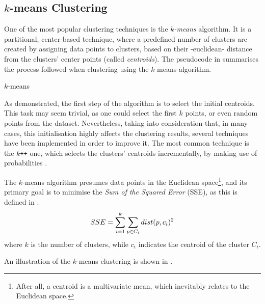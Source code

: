 \subsection{\texorpdfstring{$k$}{k}-means Clustering}
\label{subsec:k-means-clustering}

One of the most popular clustering techniques is the \textit{$k$-means} algorithm. It is a partitional, center-based technique, where a predefined number of clusters are created by assigning data points to clusters, based on their -euclidean- distance from the clusters' center points (called \textit{centroids}). The pseudocode in  summarises the process followed when clustering using the $k$-means algorithm.

\begin{algorithm}[ht]
\caption[$k$-means]{$k$-means}
\label{algorithms:k-means}

\end{algorithm}

As demonstrated, the first step of the algorithm is to select the initial centroids. This task may seem trivial, as one could select the first $k$ points, or even random points from the dataset. Nevertheless, taking into consideration that, in many cases, this initialisation highly affects the clustering results, several techniques have been implemented in order to improve it. The most common technique is the $k$\verb!++! one, which selects the clusters' centroids incrementally, by making use of probabilities \cite{Arthur:2007}.

The $k$-means algorithm presumes data points in the Euclidean space\footnote{After all, a centroid is a multivariate mean, which inevitably relates to the Euclidean space.}, and its primary goal is to minimise the \textit{Sum of the Squared Error} (SSE), as this is defined in .
%
\vspace{1.5ex}
\begin{equation}
 \label{eq:kmeans-sse}
 SSE = \sum_{i=1}^{k} \sum_{p\in C_i} dist(p,c_i)^{2}
 \vspace{1.5ex}
\end{equation}
%
where $k$ is the number of clusters, while $c_i$ indicates the centroid of the cluster $C_i$.

An illustration of the $k$-means clustering is shown in .

